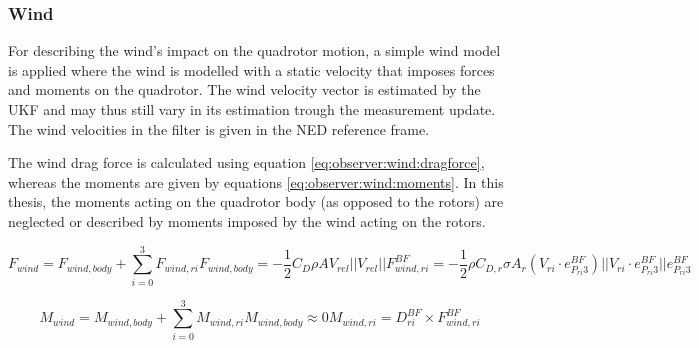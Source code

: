 \subsubsection{Wind}
    For describing the wind's impact on the quadrotor motion,
    a simple wind model is applied where the wind is modelled with
    a static velocity that imposes forces and moments on the quadrotor.
    The wind velocity vector is estimated by the UKF and may thus still vary
    in its estimation trough the measurement update.
    The wind velocities in the filter is given in the NED reference frame.

    The wind drag force is calculated using equation \eqref{eq:observer:wind:dragforce},
    whereas the moments are given by equations \eqref{eq:observer:wind:moments}.
    In this thesis, the moments acting on the quadrotor body (as opposed to the rotors)
    are neglected or described by moments imposed by the wind acting on the rotors.

    \begin{subequations}
    \label{eq:observer:wind:dragforce}
        \begin{equation}
            F_{wind} = F_{wind,body} + \sum_{i=0}^{3} F_{wind,ri}
        \end{equation}
        \begin{equation}
            F_{wind,body} = -\frac{1}{2} C_{D} \rho A V_{rel} ||V_{rel}||
        \end{equation}
        \begin{equation}
            F^{BF}_{wind,ri} = -\frac{1}{2} \rho C_{D,r} \sigma A_{r} (V_{ri} \cdot e_{P_{ri}3}^{BF}) ||V_{ri} \cdot e_{P_{ri}3}^{BF}|| e_{P_{ri}3}^{BF}
        \end{equation}
    \end{subequations}

    \begin{subequations}
    \label{eq:observer:wind:moments}
        \begin{equation}
            M_{wind} = M_{wind,body} + \sum_{i=0}^{3}M_{wind,ri}
        \end{equation}
        \begin{equation}
            M_{wind,body} \approx 0 %
        \end{equation}
        \begin{equation}
            M_{wind,ri} = D_{ri}^{BF} \times F^{BF}_{wind,ri}
        \end{equation}
    \end{subequations}


